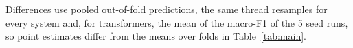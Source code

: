Differences use pooled out-of-fold predictions, the same thread resamples for every system and, for transformers, the mean of the macro-F1 of the 5 seed runs, so point estimates differ from the means over folds in Table~\ref{tab:main}.

